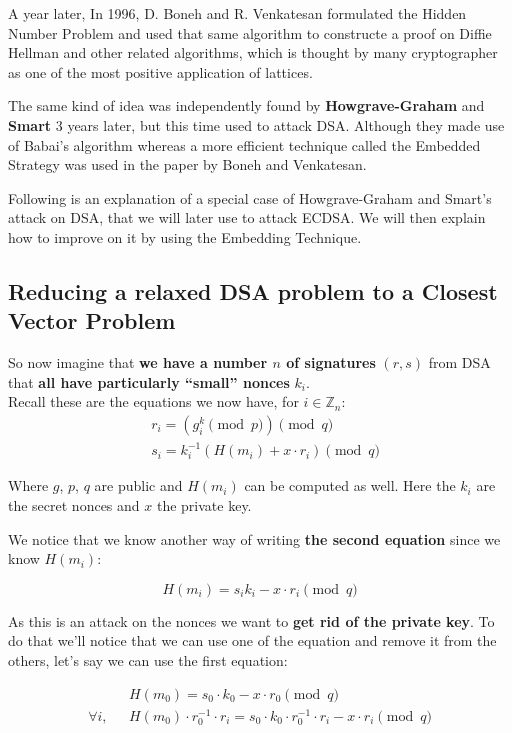 \documentclass[a4paper,11pt]{article}
\begin{document}
A year later, In 1996, D. Boneh and R. Venkatesan\cite{boneh-venkatesan} formulated the Hidden Number Problem and used that same algorithm to constructe a proof on Diffie Hellman and other related algorithms, which is thought by many cryptographer as one of the most positive application of lattices.

The same kind of idea was independently found by \textbf{Howgrave-Graham} and \textbf{Smart} 3 years later\cite{HG-smart}, but this time used to attack DSA. Although they made use of Babai's algorithm whereas a more efficient technique called the Embedded Strategy was used in the paper by Boneh and Venkatesan.

Following is an explanation of a special case of Howgrave-Graham and Smart's attack on DSA, that we will later use to attack ECDSA. We will then explain how to improve on it by using the Embedding Technique.

\subsection{Reducing a relaxed DSA problem to a Closest Vector Problem}

So now imagine that \textbf{we have a number $n$ of signatures} $(r,s)$ from DSA that \textbf{all have particularly ``small'' nonces} $k_i$.\\
Recall these are the equations we now have, for $i \in \mathbb{Z}_n$:
\begin{align*}
&r_i = (g^k_i \pmod{p}) \pmod{q}\\
&s_i = k_i^{-1} ( H(m_i) + x \cdot r_i ) \pmod{q}
\end{align*}

Where $g$, $p$, $q$ are public and $H(m_i)$ can be computed as well. Here the $k_i$ are the secret nonces and $x$ the private key.

We notice that we know another way of writing \textbf{the second equation} since we know $H(m_i)$:

$$ H(m_i) = s_i k_i - x \cdot r_i \pmod{q} $$

As this is an attack on the nonces we want to \textbf{get rid of the private key}. To do that we'll notice that we can use one of the equation and remove it from the others, let's say we can use the first equation:

\begin{align*}
&H(m_0) = s_0 \cdot k_0 - x \cdot r_0 \pmod{q}\\
\forall i, \text{ } &H(m_0) \cdot r_0^{-1} \cdot r_i = s_0 \cdot k_0 \cdot r_0^{-1} \cdot r_i - x \cdot r_i \pmod{q}
\end{align*}
\end{document}
